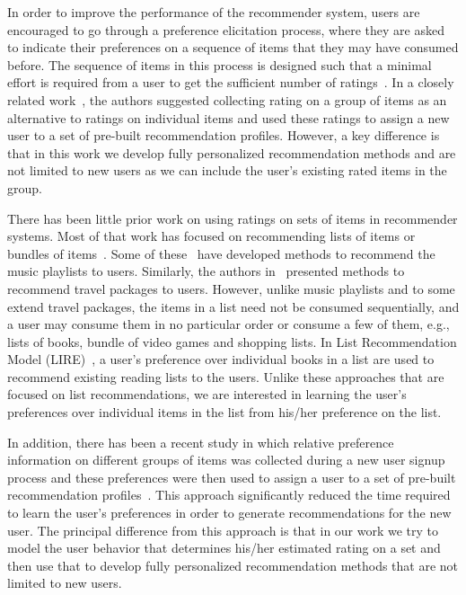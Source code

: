 

\iffalse
In order to improve the performance of the recommender system, users are
encouraged
to go through a preference elicitation process, where they are asked to indicate
their preferences on a sequence of items that they may have consumed before. The
sequence of items in this process is designed such that a minimal effort is
required from a user to get the sufficient number of ratings~\cite{r50,r51,r52}. 
In a closely related work~\cite{r53}, the authors suggested collecting rating on a
group of items as an alternative
to ratings on individual items and used these ratings to assign a new user to a
set of pre-built recommendation profiles. However, a key difference is that in
this work we develop fully personalized recommendation methods and are not
limited to new users as we can include the user's existing  rated items in
the group.

There has been little prior work on using ratings on sets of items in recommender
systems. Most of that work has focused on recommending lists of items or bundles of
items~\cite{xie2010breaking}. Some of these~\cite{r55,moore2012learning,aizenberg2012build} have developed methods to recommend the music
playlists to users. Similarly, the authors
in~\cite{interdonato2013versatile,r54,liu2011personalized,xie2011comprec} presented methods to recommend travel packages to users. However, unlike
music playlists and to some extend travel packages, the items in a list need not
be consumed sequentially, and a user may consume them in no particular
order or consume a few of them, e.g., lists of books, bundle of video games 
and shopping lists. In List Recommendation Model
(LIRE)~\cite{r56}, a user's preference over individual books in a list are used to
recommend existing reading lists to the users.
Unlike these approaches that are focused on list recommendations, we are 
interested in learning the user's preferences over individual items in the list
from his/her preference on the list. 



In addition, there has been a  recent study in which relative
preference information on different groups of items was collected during a new user
signup process and these preferences were then used to assign a user to a set of
pre-built recommendation profiles~\cite{r53}. 
This approach significantly reduced the time required to learn the user's
preferences in order to generate recommendations for the new user.
The principal difference from this 
approach is that in our work we try to model the user behavior that determines
his/her estimated rating on a set and then use that to develop fully
personalized recommendation methods that are not limited to new users.

